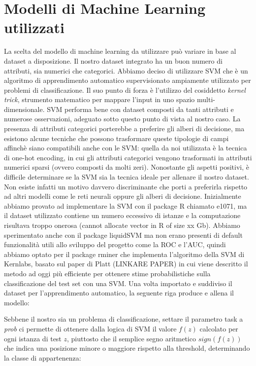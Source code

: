 \section{Modelli di Machine Learning utilizzati}



La scelta del modello di machine learning da utilizzare può variare in base al dataset a disposizione. Il nostro dataset integrato ha un buon numero di attributi, sia numerici che categorici.
Abbiamo deciso di utilizzare SVM che è un algoritmo di apprendimento automatico supervisionato ampiamente utilizzato per problemi di classificazione. Il suo punto di forza è l'utilizzo del cosiddetto \textit{kernel trick}, strumento matematico per mappare l'input in uno spazio multi-dimensionale. SVM performa bene con dataset composti da tanti attributi e numerose osservazioni, adeguato sotto questo punto di vista al nostro caso.
La presenza di attributi categorici porterebbe a preferire gli alberi di decisione, ma esistono alcune tecniche che possono trasformare queste tipologie di campi affinchè siano compatibili anche con le SVM: quella da noi utilizzata è la tecnica di one-hot encoding, in cui gli attributi categorici vengono trasformati in attributi numerici sparsi (ovvero composti da molti zeri).
Nonostante gli aspetti positivi, è difficile determinare se la SVM sia la tecnica ideale per allenare il nostro dataset. Non esiste infatti un motivo davvero discriminante che porti a preferirla rispetto ad altri modelli come le reti neurali oppure gli alberi di decisione.
Inizialmente abbiamo provato ad implementare la SVM con il package R chiamato e1071, ma il dataset utilizzato contiene un numero eccessivo di istanze e la computazione risultava troppo onerosa (cannot allocate vector in R of size xx Gb). Abbiamo sperimentato anche con il package liquidSVM ma non erano presenti di default funzionalità utili allo sviluppo del progetto come la ROC e l'AUC, quindi abbiamo optato per il package rminer che implementa l’algoritmo della SVM di Kernlabs, basato sul paper di Platt (LINKARE PAPER) in cui viene descritto il metodo ad oggi più efficiente per ottenere stime probabilistiche sulla classificazione del test set con una SVM.
Una volta importato e suddiviso il dataset per l’apprendimento automatico, la seguente riga produce e allena il modello:

\texttt{}

Sebbene il nostro sia un problema di classificazione, settare il parametro task a \textit{prob} ci permette di ottenere dalla logica di SVM il valore $ f(z) $ calcolato per ogni istanza di test $z$, piuttosto che il semplice segno aritmetico $sign(f(z))$ che indica una posizione minore o maggiore rispetto alla threshold, determinando la classe di appartenenza:

